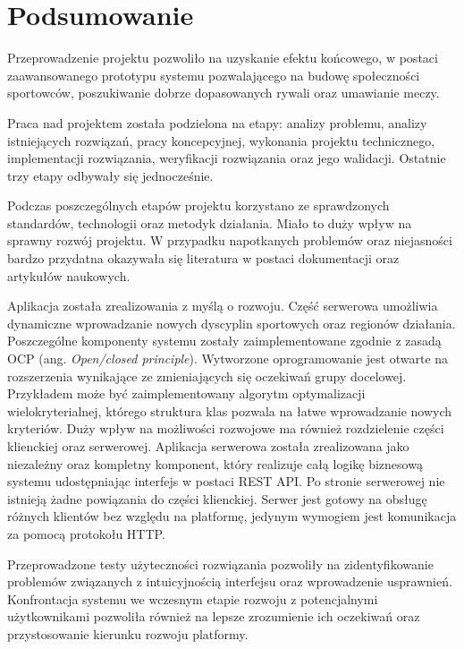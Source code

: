 \chapter{Podsumowanie}

Przeprowadzenie projektu pozwoliło na uzyskanie efektu końcowego, w postaci zaawansowanego prototypu systemu pozwalającego na budowę społeczności sportowców, poszukiwanie dobrze dopasowanych rywali oraz umawianie meczy. 

Praca nad projektem została podzielona na etapy: analizy problemu, analizy istniejących rozwiązań, pracy koncepcyjnej, wykonania projektu technicznego, implementacji rozwiązania, weryfikacji rozwiązania oraz jego walidacji. Ostatnie trzy etapy odbywały się jednocześnie.

Podczas poszczególnych etapów projektu korzystano ze sprawdzonych standardów, technologii oraz metodyk działania. Miało to duży wpływ na sprawny rozwój projektu. W przypadku napotkanych problemów oraz niejasności bardzo przydatna okazywała się literatura w postaci dokumentacji oraz artykułów naukowych.

Aplikacja została zrealizowania z myślą o rozwoju. Część serwerowa umożliwia dynamiczne wprowadzanie nowych dyscyplin sportowych oraz regionów działania. Poszczególne komponenty systemu zostały zaimplementowane zgodnie z zasadą OCP (ang. \textit{Open/closed principle}). Wytworzone oprogramowanie jest otwarte na rozszerzenia wynikające ze zmieniających się oczekiwań grupy docelowej. Przykładem może być zaimplementowany algorytm optymalizacji wielokryterialnej, którego struktura klas pozwala na łatwe wprowadzanie nowych kryteriów. Duży wpływ na możliwości rozwojowe ma również rozdzielenie części klienckiej oraz serwerowej. Aplikacja serwerowa została zrealizowana jako niezależny oraz kompletny komponent, który realizuje całą logikę biznesową systemu udostępniając interfejs w postaci REST API. Po stronie serwerowej nie istnieją żadne powiązania do części klienckiej. Serwer jest gotowy na obsługę różnych klientów bez względu na platformę, jedynym wymogiem jest komunikacja za pomocą protokołu HTTP.




Przeprowadzone testy użyteczności rozwiązania pozwoliły na zidentyfikowanie problemów związanych z intuicyjnością interfejsu oraz wprowadzenie usprawnień. Konfrontacja systemu we wczesnym etapie rozwoju z potencjalnymi użytkownikami pozwoliła również na lepsze zrozumienie ich oczekiwań oraz przystosowanie kierunku rozwoju platformy.

